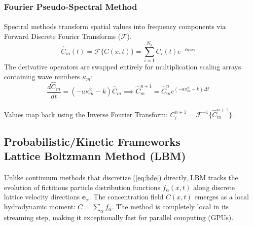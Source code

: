\subsubsection*{Fourier Pseudo-Spectral Method}
\paragraph{}
Spectral methods transform spatial values into frequency components via Forward Discrete Fourier Transforms ($\mathcal{F}$).
\begin{equation*}
\hat{C}_m(t) = \mathcal{F}\{C(x,t)\} = \sum_{i=1}^{N_x} C_i(t) e^{-I m x_i}
\end{equation*}
The derivative operators are swapped entirely for multiplication scaling arrays containing wave numbers $\kappa_m$:
\begin{equation*}
\frac{d\hat{C}_m}{dt} = \left( -a \kappa_m^2 - k \right) \hat{C}_m \implies \hat{C}_m^{n+1} = \hat{C}_m^n e^{(-a \kappa_m^2 - k)\Delta t}
\end{equation*}
\paragraph{}
Values map back using the Inverse Fourier Transform: $C_i^{n+1} = \mathcal{F}^{-1}\{\hat{C}_m^{n+1}\}$.

\subsection*{Probabilistic/Kinetic Frameworks\\ \normalsize Lattice Boltzmann Method (LBM)}
\paragraph{}
Unlike continuum methods that discretize (\ref{eq:hde}) directly, LBM tracks the evolution of fictitious particle distribution functions $f_\alpha(x, t)$ along discrete lattice velocity directions $\mathbf{e}_\alpha$. The concentration field $C(x,t)$ emerges as a local hydrodynamic moment: $C = \sum_\alpha f_\alpha$. The method is completely local in its streaming step, making it exceptionally fast for parallel computing (GPUs). 

